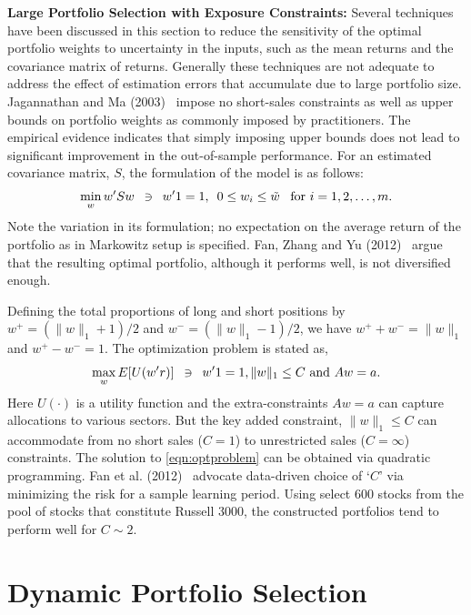 \noindent\textbf{Large Portfolio Selection with Exposure Constraints:} Several techniques have been discussed in this section to reduce the sensitivity of the optimal portfolio weights to uncertainty in the inputs, such as the mean returns and the covariance matrix of returns. Generally these techniques are not adequate to address the effect of estimation errors that accumulate due to large portfolio size. Jagannathan and Ma (2003)~\cite{jagma} impose no short-sales constraints as well as upper bounds on portfolio weights as commonly imposed by practitioners. The empirical evidence indicates that simply imposing upper bounds does not lead to significant improvement in the out-of-sample performance. For an estimated covariance matrix, $S$, the formulation of the model is as follows:
	\begin{equation} \label{eqn:estcovmat}
	\min_w w'Sw \enskip \ni \enskip w'1=1, \enskip 0\leq w_i \leq \tilde{w} \enskip\text{ for }i= 1, 2, \ldots, m.
	\end{equation}
Note the variation in its formulation; no expectation on the average return of the portfolio as in Markowitz setup is specified. Fan, Zhang and Yu (2012)~\cite{fanzhanyu} argue that the resulting optimal portfolio, although it performs well, is not diversified enough. 


Defining the total proportions of long and short positions by $w^+=(\|w\|_1+1)/2$ and $w^-= (\|w\|_1-1)/2$, we have $w^+ + w^-= \|w\|_1$ and $w^+ - w^- =1$. The optimization problem is stated as,
	\begin{equation} \label{eqn:optproblem}
	\max_w E[U(w'r)] \enskip \ni \enskip w'1=1, \|w\|_1 \leq C \text{ and } Aw=a.
	\end{equation}
Here $U(\cdot)$ is a utility function and the extra-constraints $Aw=a$ can capture allocations to various sectors. But the key added constraint, $\|w\|_1 \leq C$ can accommodate from no short sales ($C=1$) to unrestricted sales ($C= \infty$) constraints. The solution to \eqref{eqn:optproblem} can be obtained via quadratic programming. Fan et al. (2012)~\cite{fanzhanyu} advocate data-driven choice of `$C$' via minimizing the risk for a sample learning period. Using select 600 stocks from the pool of stocks that constitute Russell 3000, the constructed portfolios tend to perform well for $C \sim 2$. 



\section{Dynamic Portfolio Selection}

